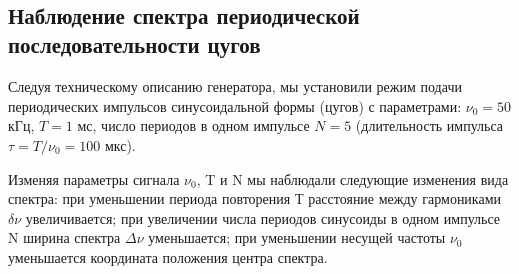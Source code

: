 \documentclass[a4paper,12pt]{article}
\begin{document}
\begin{figure}[h]
    \centering
    \\
\end{figure}


\newpage
\subsection*{Наблюдение спектра периодической последовательности цугов}

Следуя техническому описанию генератора, мы установили режим подачи периодических импульсов синусоидальной формы (цугов) с параметрами: $\nu_0 = 50$ кГц, $T = 1$ мс, число периодов в одном импульсе $N = 5$ (длительность импульса $\tau = T/\nu_0 = 100$ мкс).

Изменяя параметры сигнала $\nu_0$, T и N мы наблюдали следующие изменения вида спектра: при уменьшении периода повторения Т расстояние между гармониками $\delta \nu$ увеличивается; при увеличении числа периодов синусоиды в одном импульсе N ширина спектра $\Delta \nu$ уменьшается; при уменьшении несущей частоты $\nu_0$ уменьшается координата положения центра спектра.

\begin{figure}[h]
    \captionsetup[subfloat]{labelformat=empty}
\end{figure}
\end{document}
